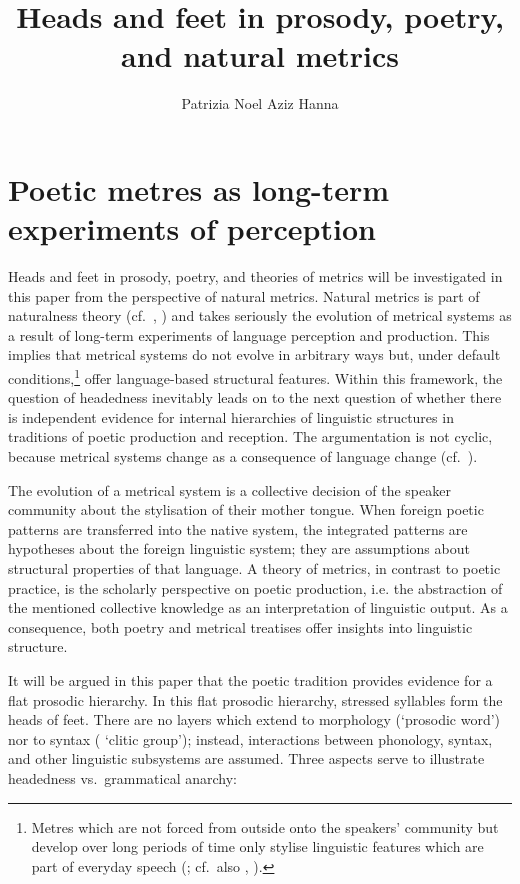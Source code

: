 \documentclass[output=paper
  ,nobabel
  ,uniformtopskip %
]{langscibook}
\title{Heads and feet in prosody, poetry, and natural metrics}
\author{Patrizia Noel Aziz Hanna\orcid{0000-0001-7016-8587}\affiliation{Otto-Friedrich-Universität Bamberg}}
\begin{document}
\maketitle
\section{Poetic metres as long-term experiments of perception}\label{sec-long-term}

Heads and feet in prosody, poetry, and theories of metrics will be investigated in this paper from the perspective of natural metrics. Natural metrics is part of naturalness theory (cf.\ \citealt{Donegan1979}, \citealt{HurchNathan1996}) and takes seriously the evolution of metrical systems as a result of long-term experiments of language perception and production. This implies that metrical systems do not evolve in arbitrary ways but, under default conditions,\footnote{{Metres which are not forced from outside onto the speakers' community but develop over long periods of time only stylise linguistic features which are part of everyday speech (\citealt{Vennemann1995}; cf.\ also \citealt{Miller1902}, \citealt{Allen1973}).} } offer language-based structural features. Within this framework, the question of headedness inevitably leads on to the next question of whether there is independent evidence for internal hierarchies of linguistic structures in traditions of poetic production and reception. The argumentation is not cyclic, because metrical systems change as a consequence of language change (cf.\ \eg  \cite{NoelAzizHanna2008a}).

The evolution of a metrical system is a collective decision of the speaker community about the stylisation of their mother tongue. When foreign poetic patterns are transferred into the native system, the integrated patterns are hypotheses about the foreign linguistic system; they are assumptions about structural properties of that language. A theory of metrics, in contrast to poetic practice, is the scholarly perspective on poetic production, i.e. the abstraction of the mentioned collective knowledge as an interpretation of linguistic output. As a consequence, both poetry and metrical treatises offer insights into linguistic structure.

It will be argued in this paper that the  poetic tradition provides evidence for a flat
prosodic hierarchy. In this flat prosodic hierarchy, stressed syllables form the heads of
feet. There are no layers which extend to morphology (\eg `prosodic word') nor to syntax (\eg
`clitic group'); instead, interactions between phonology, syntax, and other linguistic subsystems
are assumed. Three aspects serve to illustrate headedness vs.\ grammatical anarchy:
\end{document}
